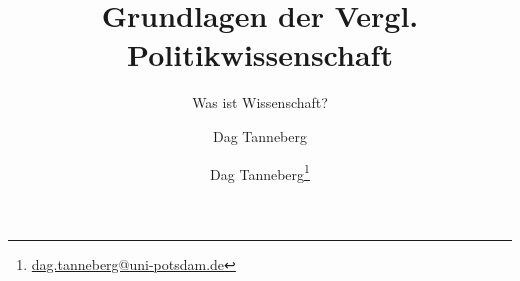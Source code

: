 \usepackage[ngerman]{babel}
\usepackage{graphicx}
\usepackage{hyperref}
\usepackage{multirow}
\usepackage{booktabs}

\author{Dag Tanneberg}
\title{Grundlagen der Vergl. Politikwissenschaft}
\subtitle{Was ist Wissenschaft?}
\author{Dag Tanneberg\thanks{%
  \href{mailto:dag.tanneberg@uni-potsdam.de}%
    {dag.tanneberg@uni-potsdam.de}
  }
}
\hypersetup{colorlinks, urlcolor = red, linkcolor = }
